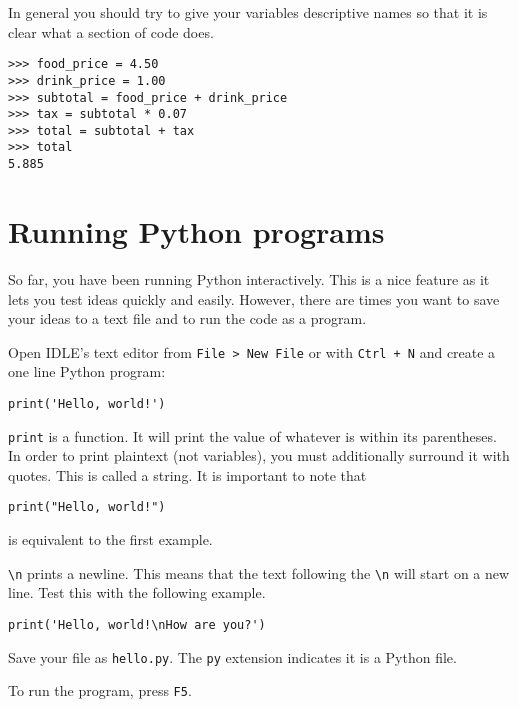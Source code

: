 \documentclass[12pt,hidelinks]{article}
\begin{document}
In general you should try to give your variables descriptive names so that it is clear what a section of code does.

\begin{lstlisting}[style=bash]
>>> food_price = 4.50
>>> drink_price = 1.00
>>> subtotal = food_price + drink_price
>>> tax = subtotal * 0.07
>>> total = subtotal + tax
>>> total
5.885
\end{lstlisting}

\pagebreak
\section{Running Python programs} 

So far, you have been running Python interactively. This is a nice feature as it lets you test ideas quickly and easily. However, there are times you want to save your ideas to a text file and to run the code as a program.

Open IDLE's text editor from \texttt{File > New File} or with \texttt{Ctrl + N} and create a one line Python program:

\begin{lstlisting}[style=python]
print('Hello, world!')
\end{lstlisting}

\texttt{print} is a function. It will print the value of whatever is within its parentheses. In order to print plaintext (not variables), you must additionally surround it with quotes. This is called a string. It is important to note that

\begin{lstlisting}[style=python]
print("Hello, world!")
\end{lstlisting}

is equivalent to the first example.

\texttt{\textbackslash n} prints a newline. This means that the text following the \texttt{\textbackslash n} will start on a new line. Test this with the following example.

\begin{lstlisting}[style=python]
print('Hello, world!\nHow are you?')
\end{lstlisting}

Save your file as \texttt{hello.py}. The \texttt{py} extension indicates it is a Python file.

To run the program, press \texttt{F5}.
\end{document}
